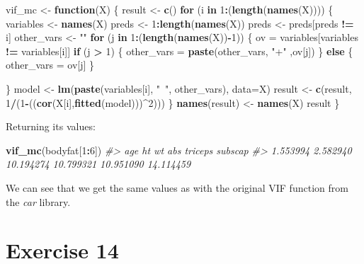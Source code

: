 \documentclass[]{article}
\newenvironment{Shaded}{\begin{snugshade}}{\end{snugshade}}
\newcommand{\CommentTok}[1]{\textcolor[rgb]{0.56,0.35,0.01}{\textit{#1}}}
\newcommand{\ControlFlowTok}[1]{\textcolor[rgb]{0.13,0.29,0.53}{\textbf{#1}}}
\newcommand{\DataTypeTok}[1]{\textcolor[rgb]{0.13,0.29,0.53}{#1}}
\newcommand{\DecValTok}[1]{\textcolor[rgb]{0.00,0.00,0.81}{#1}}
\newcommand{\KeywordTok}[1]{\textcolor[rgb]{0.13,0.29,0.53}{\textbf{#1}}}
\newcommand{\NormalTok}[1]{#1}
\newcommand{\OperatorTok}[1]{\textcolor[rgb]{0.81,0.36,0.00}{\textbf{#1}}}
\newcommand{\StringTok}[1]{\textcolor[rgb]{0.31,0.60,0.02}{#1}}
\begin{document}
\begin{Shaded}
\begin{Highlighting}[]
\NormalTok{vif_mc <-}\StringTok{ }\ControlFlowTok{function}\NormalTok{(X) \{}
\NormalTok{    result <-}\StringTok{ }\KeywordTok{c}\NormalTok{()}
    \ControlFlowTok{for}\NormalTok{ (i }\ControlFlowTok{in} \DecValTok{1}\OperatorTok{:}\NormalTok{(}\KeywordTok{length}\NormalTok{(}\KeywordTok{names}\NormalTok{(X)))) \{}
\NormalTok{        variables <-}\StringTok{ }\KeywordTok{names}\NormalTok{(X)}
\NormalTok{        preds <-}\StringTok{ }\DecValTok{1}\OperatorTok{:}\KeywordTok{length}\NormalTok{(}\KeywordTok{names}\NormalTok{(X))}
\NormalTok{        preds <-}\StringTok{ }\NormalTok{preds[preds }\OperatorTok{!=}\StringTok{ }\NormalTok{i]}
\NormalTok{        other_vars <-}\StringTok{ ""}
        \ControlFlowTok{for}\NormalTok{ (j }\ControlFlowTok{in} \DecValTok{1}\OperatorTok{:}\NormalTok{(}\KeywordTok{length}\NormalTok{(}\KeywordTok{names}\NormalTok{(X))}\OperatorTok{-}\DecValTok{1}\NormalTok{)) \{}
\NormalTok{            ov =}\StringTok{ }\NormalTok{variables[variables }\OperatorTok{!=}\StringTok{ }\NormalTok{variables[i]]}
            \ControlFlowTok{if}\NormalTok{ (j }\OperatorTok{>}\StringTok{ }\DecValTok{1}\NormalTok{) \{}
\NormalTok{                other_vars =}\StringTok{ }\KeywordTok{paste}\NormalTok{(other_vars, }\StringTok{"+"}\NormalTok{ ,ov[j])}
\NormalTok{            \} }\ControlFlowTok{else}\NormalTok{ \{}
\NormalTok{                other_vars =}\StringTok{ }\NormalTok{ov[j]}
\NormalTok{            \}}
            
\NormalTok{        \}}
\NormalTok{        model <-}\StringTok{ }\KeywordTok{lm}\NormalTok{(}\KeywordTok{paste}\NormalTok{(variables[i], }\StringTok{"~"}\NormalTok{, other_vars), }\DataTypeTok{data=}\NormalTok{X)}
\NormalTok{        result <-}\StringTok{ }\KeywordTok{c}\NormalTok{(result, }\DecValTok{1}\OperatorTok{/}\NormalTok{(}\DecValTok{1}\OperatorTok{-}\NormalTok{((}\KeywordTok{cor}\NormalTok{(X[i],}\KeywordTok{fitted}\NormalTok{(model)))}\OperatorTok{^}\DecValTok{2}\NormalTok{)))}
\NormalTok{    \}}
    \KeywordTok{names}\NormalTok{(result) <-}\StringTok{ }\KeywordTok{names}\NormalTok{(X)}
\NormalTok{    result}
\NormalTok{\}}
\end{Highlighting}
\end{Shaded}

Returning its values:

\begin{Shaded}
\begin{Highlighting}[]
\KeywordTok{vif_mc}\NormalTok{(bodyfat[}\DecValTok{1}\OperatorTok{:}\DecValTok{6}\NormalTok{])}
\CommentTok{#>       age        ht        wt       abs   triceps   subscap }
\CommentTok{#>  1.553994  2.582940 10.194274 10.799321 10.951090 14.114459}
\end{Highlighting}
\end{Shaded}

We can see that we get the same values as with the original VIF function
from the \emph{car} library.

\hypertarget{exercise-14}{%
\section{Exercise 14}\label{exercise-14}}
\end{document}
